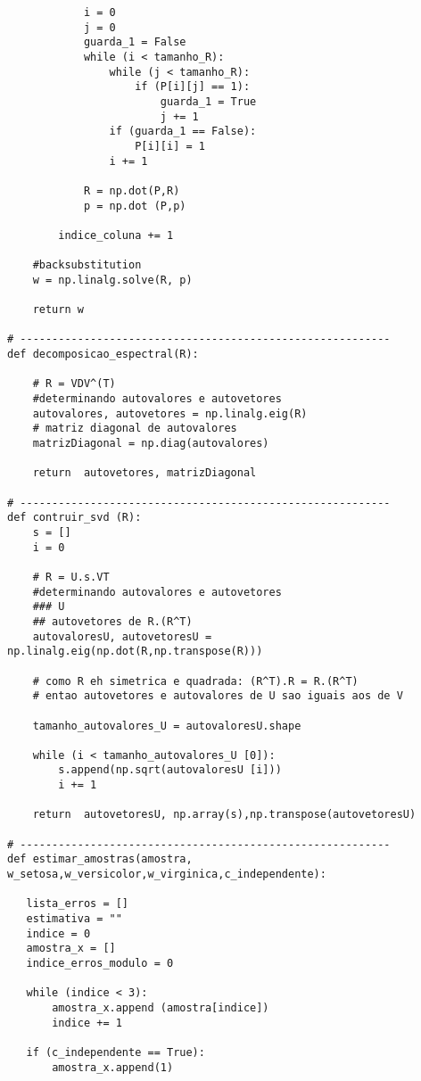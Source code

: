 \documentclass[a4paper,12pt,twoside]{article}
\begin{document}
\begin{lstlisting}
            i = 0
            j = 0
            guarda_1 = False
            while (i < tamanho_R):
                while (j < tamanho_R):
                    if (P[i][j] == 1):
                        guarda_1 = True
                        j += 1
                if (guarda_1 == False):
                    P[i][i] = 1
                i += 1
            
            R = np.dot(P,R)
            p = np.dot (P,p)
       
        indice_coluna += 1 
    
    #backsubstitution
    w = np.linalg.solve(R, p)
      
    return w
           
# ----------------------------------------------------------
def decomposicao_espectral(R):
    
    # R = VDV^(T)
    #determinando autovalores e autovetores
    autovalores, autovetores = np.linalg.eig(R) 
    # matriz diagonal de autovalores
    matrizDiagonal = np.diag(autovalores) 
       
    return  autovetores, matrizDiagonal

# ----------------------------------------------------------
def contruir_svd (R):
    s = []
    i = 0
 
    # R = U.s.VT
    #determinando autovalores e autovetores
    ### U
    ## autovetores de R.(R^T)
    autovaloresU, autovetoresU = np.linalg.eig(np.dot(R,np.transpose(R)))
    
    # como R eh simetrica e quadrada: (R^T).R = R.(R^T)
    # entao autovetores e autovalores de U sao iguais aos de V
    
    tamanho_autovalores_U = autovaloresU.shape
      
    while (i < tamanho_autovalores_U [0]):       
        s.append(np.sqrt(autovaloresU [i]))
        i += 1
    
    return  autovetoresU, np.array(s),np.transpose(autovetoresU)

# ----------------------------------------------------------
def estimar_amostras(amostra, w_setosa,w_versicolor,w_virginica,c_independente):
    
   lista_erros = []
   estimativa = ""
   indice = 0
   amostra_x = []
   indice_erros_modulo = 0
   
   while (indice < 3):
       amostra_x.append (amostra[indice])
       indice += 1
       
   if (c_independente == True):
       amostra_x.append(1)
      

\end{lstlisting}
\end{document}
